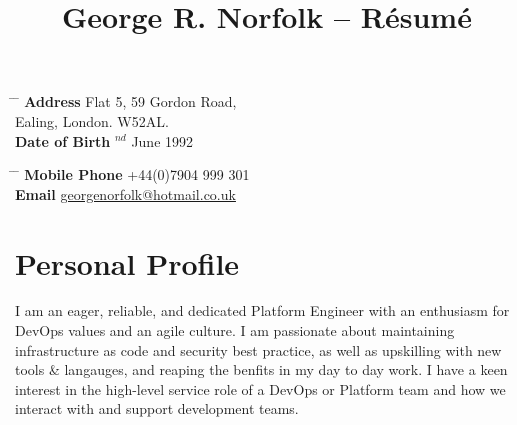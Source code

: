 \documentclass[10pt]{article} %
\begin{document}

\title{George R. Norfolk -- Résumé} %


\parbox{0.5\textwidth}{ %
\begin{tabbing} %
\hspace{3cm} \= \hspace{4cm} \= \kill %
{\bf Address} \> Flat 5, 59 Gordon Road,\\ %
\> Ealing, London. W52AL. \\ %
{\bf Date of Birth} $^{nd}$ June 1992 \\ %
\end{tabbing}}
\hfill %
\parbox{0.5\textwidth}{ %
\begin{tabbing} %
\hspace{3cm} \= \hspace{4cm} \= \kill %
{\bf Mobile Phone} \> +44(0)7904 999 301 \\ %
{\bf Email} \> \href{mailto:georgenorfolk@hotmail.co.uk}{georgenorfolk@hotmail.co.uk} \\ %
\end{tabbing}}


\section{Personal Profile}
\small
I am an eager, reliable, and dedicated Platform Engineer with an enthusiasm for DevOps values and an agile culture. I am passionate about maintaining infrastructure as code and security best practice, as well as upskilling with new tools \& langauges, and reaping the benfits in my day to day work. I have a keen interest in the high-level service role of a DevOps or Platform team and how we interact with and support development teams.
\end{document}
